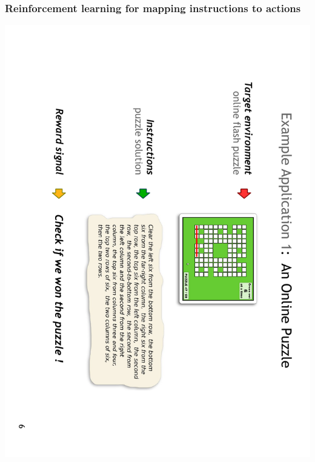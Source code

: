 \documentclass[ignorenonframetext]{beamer}
\begin{document}
\begin{frame}\frametitle{Reinforcement learning for mapping instructions to actions}
\begin{center}
\href{http://groups.csail.mit.edu/rbg/code/rl}{
\includegraphics[angle=90,width=\textwidth]{images/branavan-crossblock.pdf}}
\end{center}
\end{frame}
\end{document}
